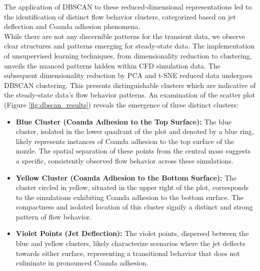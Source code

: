 The application of DBSCAN to these reduced-dimensional representations led to the identification of distinct flow behavior clusters, categorized based on jet deflection and Coanda adhesion phenomena.\\
While there are not any discernible patterns for the transient data, we observe clear structures and patterns emerging for steady-state data. 
The implementation of unsupervised learning techniques, from dimensionality reduction to clustering, unveils the nuanced patterns hidden within CFD simulation data. The subsequent dimensionality reduction by PCA and t-SNE reduced data undergoes DBSCAN clustering. This presents distinguishable clusters which are indicative of the steady-state data's flow behavior patterns. An examination of the scatter plot (Figure \ref{fig:dbscan_results}) reveals the emergence of three distinct clusters:

\begin{itemize}
  \item \textbf{Blue Cluster (Coanda Adhesion to the Top Surface):} The blue cluster, isolated in the lower quadrant of the plot and denoted by a blue ring, likely represents instances of Coanda adhesion to the top surface of the nozzle. The spatial separation of these points from the central mass suggests a specific, consistently observed flow behavior across these simulations.
  \item \textbf{Yellow Cluster (Coanda Adhesion to the Bottom Surface):} The cluster circled in yellow, situated in the upper right of the plot, corresponds to the simulations exhibiting Coanda adhesion to the bottom surface. The compactness and isolated location of this cluster signify a distinct and strong pattern of flow behavior.
  \item \textbf{Violet Points (Jet Deflection):} The violet points, dispersed between the blue and yellow clusters, likely characterize scenarios where the jet deflects towards either surface, representing a transitional behavior that does not culminate in pronounced Coanda adhesion.
\end{itemize}


